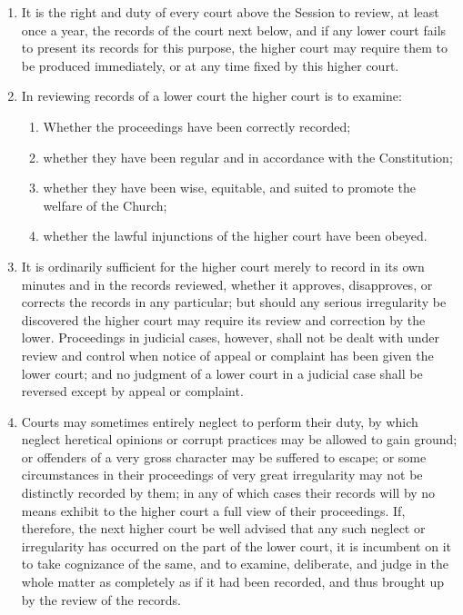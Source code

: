 \documentclass[
]{book}
\providecommand{\tightlist}{%
  \setlength{\itemsep}{0pt}\setlength{\parskip}{0pt}}
\begin{document}
\protect\hypertarget{chapter-slug-44-general-review-and-control}{\href{}{}}

\begin{enumerate}
\def\labelenumi{\arabic{enumi}.}
\tightlist
\item
  \protect\hypertarget{44}{\href{}{}}It is the right and duty of every court above the Session to review, at least once a year, the records of the court next below, and if any lower court fails to present its records for this purpose, the higher court may require them to be produced immediately, or at any time fixed by this higher court.
\item
  In reviewing records of a lower court the higher court is to examine:

  \begin{enumerate}
  \def\labelenumii{\alph{enumii}.}
  \tightlist
  \item
    Whether the proceedings have been correctly recorded;
  \item
    whether they have been regular and in accordance with the Constitution;
  \item
    whether they have been wise, equitable, and suited to promote the welfare of the Church;
  \item
    whether the lawful injunctions of the higher court have been obeyed.
  \end{enumerate}
\item
  It is ordinarily sufficient for the higher court merely to record in its own minutes and in the records reviewed, whether it approves, disapproves, or corrects the records in any particular; but should any serious irregularity be discovered the higher court may require its review and correction by the lower. Proceedings in judicial cases, however, shall not be dealt with under review and control when notice of appeal or complaint has been given the lower court; and no judgment of a lower court in a judicial case shall be reversed except by appeal or complaint.
\item
  Courts may sometimes entirely neglect to perform their duty, by which neglect heretical opinions or corrupt practices may be allowed to gain ground; or offenders of a very gross character may be suffered to escape; or some circumstances in their proceedings of very great irregularity may not be distinctly recorded by them; in any of which cases their records will by no means exhibit to the higher court a full view of their proceedings. If, therefore, the next higher court be well advised that any such neglect or irregularity has occurred on the part of the lower court, it is incumbent on it to take cognizance of the same, and to examine, deliberate, and judge in the whole matter as completely as if it had been recorded, and thus brought up by the review of the records.

\end{enumerate}
\end{document}

